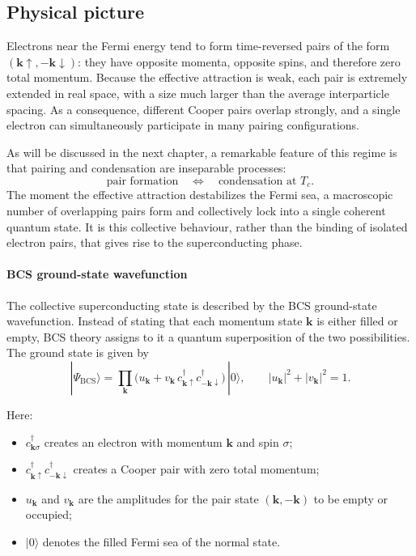 \subsection*{Physical picture}

Electrons near the Fermi energy tend to form time-reversed pairs of the form 
\((\mathbf{k}\uparrow,-\mathbf{k}\downarrow)\): they have opposite momenta, opposite spins, and therefore zero total momentum.  
Because the effective attraction is weak, each pair is extremely extended in real space, with a size much larger than the average interparticle spacing.  
As a consequence, different Cooper pairs overlap strongly, and a single electron can simultaneously participate in many pairing configurations.

As will be discussed in the next chapter, a remarkable feature of this regime is that pairing and condensation are inseparable processes:
\[
\text{pair formation} \quad \Longleftrightarrow \quad \text{condensation at } T_c.
\]
The moment the effective attraction destabilizes the Fermi sea, a macroscopic number of overlapping pairs form and collectively lock into a single coherent quantum state.  
It is this collective behaviour, rather than the binding of isolated electron pairs, that gives rise to the superconducting phase.

\paragraph{BCS ground-state wavefunction}
The collective superconducting state is described by the BCS ground-state wavefunction.  
Instead of stating that each momentum state \(\mathbf{k}\) is either filled or empty, BCS theory assigns to it a quantum superposition of the two possibilities.  
The ground state is given by
\begin{equation}
|\Psi_{\mathrm{BCS}}\rangle =
\prod_{\mathbf{k}}
\bigl(u_{\mathbf{k}} + v_{\mathbf{k}}\,
c_{\mathbf{k}\uparrow}^{\dagger}c_{-\mathbf{k}\downarrow}^{\dagger}\bigr)
\,|0\rangle,
\qquad |u_{\mathbf{k}}|^2 + |v_{\mathbf{k}}|^2 = 1.
\label{BCS_groundstate}
\end{equation}

Here:
\begin{itemize}
    \item \(c_{\mathbf{k}\sigma}^{\dagger}\) creates an electron with momentum \(\mathbf{k}\) and spin \(\sigma\);
    \item \(c_{\mathbf{k}\uparrow}^{\dagger}c_{-\mathbf{k}\downarrow}^{\dagger}\) creates a Cooper pair with zero total momentum;
    \item \(u_{\mathbf{k}}\) and \(v_{\mathbf{k}}\) are the amplitudes for the pair state \((\mathbf{k},-\mathbf{k})\) to be empty or occupied;
    \item \(|0\rangle\) denotes the filled Fermi sea of the normal state.
\end{itemize}

